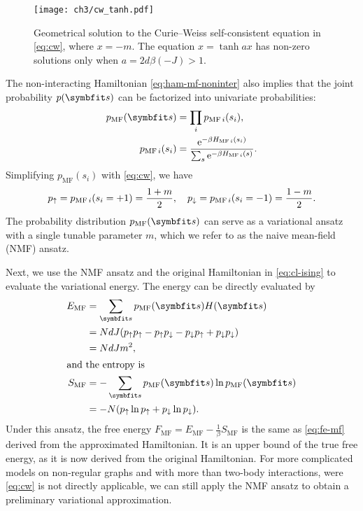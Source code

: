 \begin{figure}[htb]
\centering
\texttt{[image: ch3/cw\_tanh.pdf]}
\caption[Geometrical solution to Curie--Weiss self-consistent equation]{
Geometrical solution to the Curie--Weiss self-consistent equation in \cref{eq:cw}, where $x = -m$. The equation $x = \tanh a x$ has non-zero solutions only when $a = 2 d \beta (-J) > 1$.
}
\label{fig:cw-tanh}
\end{figure}

The non-interacting Hamiltonian \cref{eq:ham-mf-noninter} also implies that the joint probability $p(\vs)$ can be factorized into univariate probabilities:
\begin{align}
p_\text{MF}(\vs) &= \prod_i p_{\text{MF}\,i}(s_i), \\
p_{\text{MF}\,i}(s_i) &= \frac{\rme^{-\beta H_{\text{MF}\,i}(s_i)}}{\sum_s \rme^{-\beta H_{\text{MF}\,i}(s)}}.
\end{align}
Simplifying $p_\text{MF}(s_i)$ with \cref{eq:cw}, we have
\begin{equation}
p_{\uparrow} = p_{\text{MF}\,i}(s_i = +1) = \frac{1 + m}{2}, \quad
p_{\downarrow} = p_{\text{MF}\,i}(s_i = -1) = \frac{1 - m}{2}.
\label{eq:p-mf}
\end{equation}
The probability distribution $p_\text{MF}(\vs)$ can serve as a variational ansatz with a single tunable parameter $m$, which we refer to as the naive mean-field (NMF) ansatz.

Next, we use the NMF ansatz and the original Hamiltonian in \cref{eq:cl-ising} to evaluate the variational energy. The energy can be directly evaluated by
\begin{align}
E_\text{MF} &= \sum_\vs p_\text{MF}(\vs) H(\vs) \\
&= N d J (p_\spinup p_\spinup - p_\spinup p_\spindown - p_\spindown p_\spinup + p_\spindown p_\spindown) \\
&= N d J m^2, \\
\shortintertext{and the entropy is}
S_\text{MF} &= -\sum_\vs p_\text{MF}(\vs) \ln p_\text{MF}(\vs) \\
&= -N (p_\spinup \ln p_\spinup + p_\spindown \ln p_\spindown).
\end{align}
Under this ansatz, the free energy $F_\text{MF} = E_\text{MF} - \frac{1}{\beta} S_\text{MF}$ is the same as \cref{eq:fe-mf} derived from the approximated Hamiltonian. It is an upper bound of the true free energy, as it is now derived from the original Hamiltonian. For more complicated models on non-regular graphs and with more than two-body interactions, were \cref{eq:cw} is not directly applicable, we can still apply the NMF ansatz to obtain a preliminary variational approximation.

